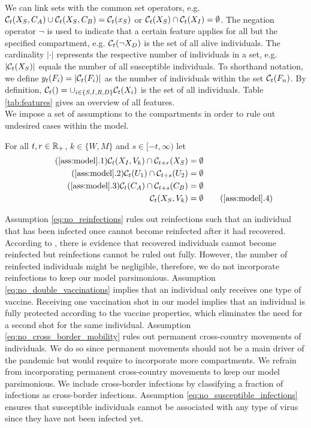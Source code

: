 We can link sets with the common set operators, e.g. $\mathcal{C}_t(X_S, C_A) \cup \mathcal{C}_t(X_S, C_B) = \mathcal{C}_t(x_S)$ or $\mathcal{C}_t(X_S) \cap \mathcal{C}_t(X_I) = \emptyset$. The negation operator $\neg$ is used to indicate that a certain feature applies for all but the specified compartment, e.g. $\mathcal{C}_t(\neg X_D)$ is the set of all alive individuals. The cardinality $|\cdot|$ represents the respective number of individuals in a set, e.g. $|\mathcal{C}_t(X_S)|$ equals the number of all susceptible individuals. To shorthand notation, we define $y_t(F_i) = |\mathcal{C}_t(F_i)|$ as the number of individuals within the set $\mathcal{C}_t(F_n)$. By definition, $\mathcal{C}_t() = \cup_{i \in \{ S, I, R,D\}} \mathcal{C}_t(X_i)$ is the set of all individuals. Table \ref{tab:features} gives an overview of all features. \\


We impose a set of assumptions to the compartments in order to rule out undesired cases within the model.
\begin{assumption}\label{ass:model}
For all $t,r \in \mathbb{R}_+$, $k \in \{W,M\}$ and $s \in [-t, \infty)$ let
\begin{align*}
\tag{\ref{ass:model}.1} 
\label{eq:no_reinfections}
\set(X_I, V_k) \cap \mathcal{C}_{t+r}(X_S) &= \emptyset \\
\tag{\ref{ass:model}.2} 
\label{eq:no_double_vaccinations}
\set(U_1) \cap \mathcal{C}_{t+s}(U_2) &= \emptyset \\
\tag{\ref{ass:model}.3} 
\label{eq:no_cross_border_mobility}
\set(C_A) \cap \mathcal{C}_{t+s}(C_B) &= \emptyset  \\
\set(X_S, V_k) &= \emptyset
\tag{\ref{ass:model}.4}
\label{eq:no_susceptible_infections}
\end{align*}
\end{assumption}
\noindent Assumption \ref{eq:no_reinfections} rules out reinfections such that an individual that has been infected once cannot become reinfected after it had recovered. According to \cite{Roy.2020}, there is evidence that recovered individuals cannot become reinfected but reinfections cannot be ruled out fully. However, the number of reinfected individuals might be negligible, therefore, we do not incorporate reinfections to keep our model parsimonious. Assumption \ref{eq:no_double_vaccinations} implies that an individual only receives one type of vaccine. Receiving one vaccination shot in our model implies that an individual is fully protected according to the vaccine properties, which eliminates the need for a second shot for the same individual. Assumption \ref{eq:no_cross_border_mobility} rules out permanent cross-country movements of individuals. We do so since  permanent movements should not be a main driver of the pandemic but would require to incorporate more compartments. We refrain from incorporating permanent cross-country movements to keep our model parsimonious. We include cross-border infections by classifying a fraction of infections as cross-border infections.
Assumption \ref{eq:no_susceptible_infections} ensures that susceptible individuals cannot be associated with any type of virus since they have not been infected yet.

